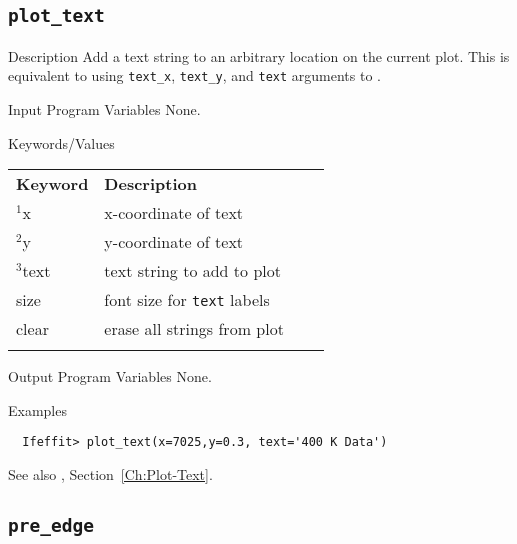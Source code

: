 \subsection{\texttt{plot\_text}}  \label{Ch:Command:plot-text}
\begin{IFFcom}
\item[Description] Add a text string to an arbitrary location on the
  current plot.  This is equivalent to using {\tt{text\_x}},
  {\tt{text\_y}}, and {\tt{text}} arguments to {}.
\item[Input Program Variables] None.
\item[Keywords/Values] 

{\relax \hspace{0.25truein}\par\noindent\relax}
\begin{tabular}{llrl}
  \textbf{Keyword} &  \textbf{Description}\\
  \noalign{\smallskip}
  ${}^1${x}     & x-coordinate of text\\
  ${}^2${y}     & y-coordinate of text\\
  ${}^3${text}  & text string to add to plot\\
  {size}        & {font size for {\tt{text}} labels}\\
  clear         & erase all strings from plot\\
  \noalign{\smallskip}
\end{tabular}
\noindent
\item[Output Program Variables] None.
\item[Examples] {\hspace{1.in} \vspace{-0.1truein} \relax }
\begin{verbatim} 
  Ifeffit> plot_text(x=7025,y=0.3, text='400 K Data')
\end{verbatim}
\item[See also] {}, Section~\ref{Ch:Plot-Text}.

\end{IFFcom}

\relax\par\vfill
\subsection{\texttt{pre\_edge}}
\label{Ch:Command:pre-edge}

